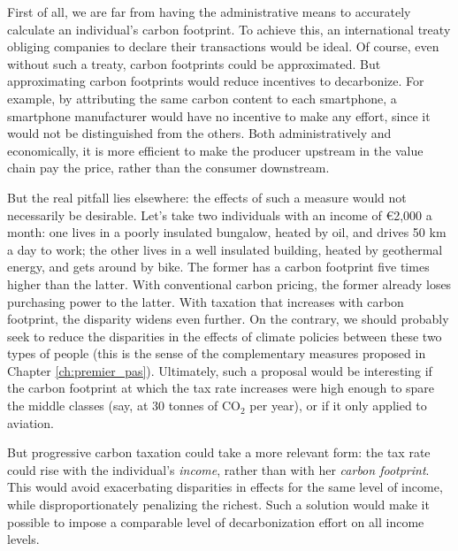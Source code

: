 \documentclass[a5paper,english,openany]{memoir}
\begin{document}
First of all, we are far from having the administrative means to accurately calculate an individual's carbon footprint. To achieve this, an international treaty obliging companies to declare their transactions would be ideal. Of course, even without such a treaty, carbon footprints could be approximated. But approximating carbon footprints would reduce incentives to decarbonize. For example, by attributing the same carbon content to each smartphone, a smartphone manufacturer would have no incentive to make any effort, since it would not be distinguished from the others. Both administratively and economically, it is more efficient to make the producer upstream in the value chain pay the price, rather than the consumer downstream. 

But the real pitfall lies elsewhere: the effects of such a measure would not necessarily be desirable. Let's take two individuals with an income of \euro{}2,000 a month: one lives in a poorly insulated bungalow, heated by oil, and drives 50 km a day to work; the other lives in a well insulated building, heated by geothermal energy, and gets around by bike. The former has a carbon footprint five times higher than the latter. With conventional carbon pricing, the former already loses purchasing power to the latter. With taxation that increases with carbon footprint, the disparity widens even further. On the contrary, we should probably seek to reduce the disparities in the effects of climate policies between these two types of people (this is the sense of the complementary measures proposed in Chapter \ref{ch:premier_pas}). Ultimately, such a proposal would be interesting if the carbon footprint at which the tax rate increases were high enough to spare the middle classes (say, at 30 tonnes of CO$_\text{2}$ per year), or if it only applied to aviation. %

But progressive carbon taxation could take a more relevant form: the tax rate could rise with the individual's \textit{income}, rather than with her \textit{carbon footprint}. This would avoid exacerbating disparities in effects for the same level of income, while disproportionately penalizing the richest. Such a solution would make it possible to impose a comparable level of decarbonization effort on all income levels. 

\end{document}
